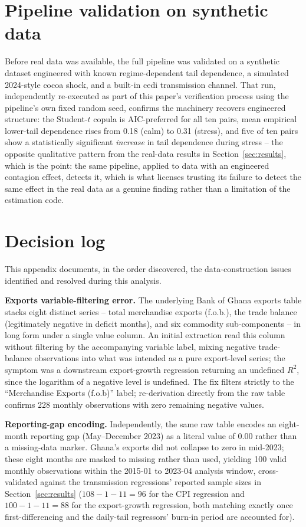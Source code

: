 \documentclass[final,3p,times,authoryear]{elsarticle}
\begin{document}
\section{Pipeline validation on synthetic data}
\label{app:synthetic}

Before real data was available, the full pipeline was validated on a
synthetic dataset engineered with known regime-dependent tail
dependence, a simulated 2024-style cocoa shock, and a built-in cedi
transmission channel. That run, independently re-executed as part of
this paper's verification process using the pipeline's own fixed random
seed, confirms the machinery recovers engineered structure: the
Student-$t$ copula is AIC-preferred for all ten pairs, mean empirical
lower-tail dependence rises from 0.18 (calm) to 0.31 (stress), and five
of ten pairs show a statistically significant \emph{increase} in tail
dependence during stress -- the opposite qualitative pattern from the
real-data results in Section~\ref{sec:results}, which is the point: the
same pipeline, applied to data with an engineered contagion effect,
detects it, which is what licenses trusting its failure to detect the
same effect in the real data as a genuine finding rather than a
limitation of the estimation code.

\section{Decision log}
\label{app:decisions}

This appendix documents, in the order discovered, the data-construction
issues identified and resolved during this analysis.

\textbf{Exports variable-filtering error.} The underlying Bank of Ghana
exports table stacks eight distinct series -- total merchandise exports
(f.o.b.), the trade balance (legitimately negative in deficit months),
and six commodity sub-components -- in long form under a single value
column. An initial extraction read this column without filtering by the
accompanying variable label, mixing negative trade-balance observations
into what was intended as a pure export-level series; the symptom was a
downstream export-growth regression returning an undefined $R^2$, since
the logarithm of a negative level is undefined. The fix filters strictly
to the ``Merchandise Exports (f.o.b)'' label; re-derivation directly
from the raw table confirms 228 monthly observations with zero remaining
negative values.

\textbf{Reporting-gap encoding.} Independently, the same raw table
encodes an eight-month reporting gap (May--December 2023) as a literal
value of 0.00 rather than a missing-data marker. Ghana's exports did not
collapse to zero in mid-2023; these eight months are masked to missing
rather than used, yielding 100 valid monthly observations within the
2015-01 to 2023-04 analysis window, cross-validated against the
transmission regressions' reported sample sizes in
Section~\ref{sec:results} ($108 - 1 - 11 = 96$ for the CPI regression and
$100 - 1 - 11 = 88$ for the export-growth regression, both matching
exactly once first-differencing and the daily-tail regressors' burn-in
period are accounted for).
\end{document}
